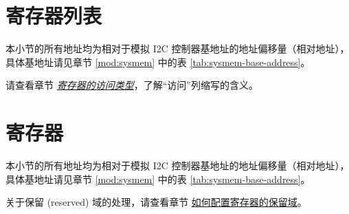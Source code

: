 \documentclass[main\_\_CN.tex]{subfiles}
\begin{document}


\newpage
\hypertarget{anai2c-reg-summ}{}
\section{寄存器列表}
\label{sec:anai2c-reg-summ}

本小节的所有地址均为相对于模拟 I2C 控制器基地址的地址偏移量（相对地址），具体基地址请见章节 \ref{mod:sysmem} \textit{} 中的表 \ref{tab:sysmem-base-address}。

请查看章节 \hyperref[glossary-access-types]{\textit{寄存器的访问类型}}，了解“访问”列缩写的含义。






\newpage
\section{寄存器}

本小节的所有地址均为相对于模拟 I2C 控制器基地址的地址偏移量（相对地址），具体基地址请见章节 \ref{mod:sysmem} \textit{} 中的表 \ref{tab:sysmem-base-address}。

关于保留 (reserved) 域的处理，请查看章节 \hyperref[programming-reserved-field]{如何配置寄存器的保留域}。


\end{document}
